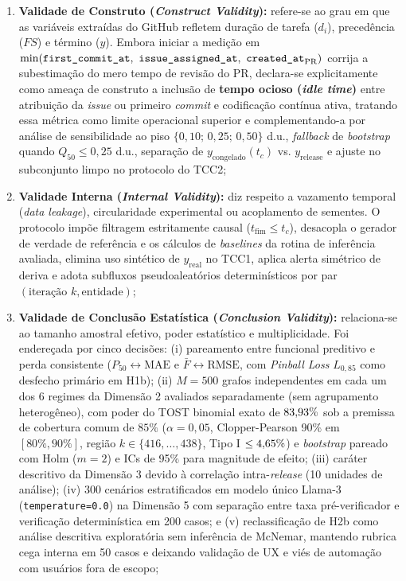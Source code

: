 \documentclass[12pt,openany,oneside,a4paper,english,brazilian,sumario=tradicional]{abntex2}
\begin{document}
\begin{enumerate}
  \item \textbf{Validade de Construto (\textit{Construct Validity}):} refere-se ao grau em que as variáveis extraídas do GitHub refletem duração de tarefa ($d_i$), precedência ($FS$) e término ($y$). Embora iniciar a medição em $\min(\texttt{first\_\allowbreak commit\_\allowbreak at},\allowbreak\ \texttt{issue\_\allowbreak assigned\_\allowbreak at},\allowbreak\ \texttt{created\_\allowbreak at}_{\mathrm{PR}})$ corrija a subestimação do mero tempo de revisão do PR, declara-se explicitamente como ameaça de construto a inclusão de \textbf{tempo ocioso (\textit{idle time})} entre atribuição da \textit{issue} ou primeiro \textit{commit} e codificação contínua ativa, tratando essa métrica como limite operacional superior e complementando-a por análise de sensibilidade ao piso $\{0{,}10;\,0{,}25;\,0{,}50\}$ d.u., \textit{fallback} de \textit{bootstrap} quando $Q_{50} \le 0{,}25$ d.u., separação de $y_{\mathrm{congelado}}(t_c)$ vs. $y_{\mathrm{release}}$ e ajuste no subconjunto limpo no protocolo do TCC2;
  \item \textbf{Validade Interna (\textit{Internal Validity}):} diz respeito a vazamento temporal (\textit{data leakage}), circularidade experimental ou acoplamento de sementes. O protocolo impõe filtragem estritamente causal ($t_{\mathrm{fim}} \le t_c$), desacopla o gerador de verdade de referência e os cálculos de \textit{baselines} da rotina de inferência avaliada, elimina uso sintético de $y_{\mathrm{real}}$ no TCC1, aplica alerta simétrico de deriva e adota subfluxos pseudoaleatórios determinísticos por par $(\text{iteração } k, \text{entidade})$;
  \item \textbf{Validade de Conclusão Estatística (\textit{Conclusion Validity}):} relaciona-se ao tamanho amostral efetivo, poder estatístico e multiplicidade. Foi endereçada por cinco decisões: (i) pareamento entre funcional preditivo e perda consistente \cite{gneiting2011} ($P_{50} \leftrightarrow \mathrm{MAE}$ e $\bar{F} \leftrightarrow \mathrm{RMSE}$, com \textit{Pinball Loss} $L_{0{,}85}$ como desfecho primário em H1b); (ii) $M=500$ grafos independentes em cada um dos 6 regimes da Dimensão 2 avaliados separadamente (sem agrupamento heterogêneo), com poder do TOST binomial exato de $83{,}93{}\%$ sob a premissa de cobertura comum de $85\%$ ($\alpha=0{,}05$, Clopper-Pearson 90\% em $[80\%,90\%]$, região $k \in \{416,\dots,438\}$, Tipo I $\le 4{,}65{}\%$) e \textit{bootstrap} pareado com Holm ($m=2$) e ICs de 95\% para magnitude de efeito; (iii) caráter descritivo da Dimensão 3 devido à correlação intra-\textit{release} (10 unidades de análise); (iv) 300 cenários estratificados em modelo único Llama-3 (\texttt{temperature=0.0}) na Dimensão 5 com separação entre taxa pré-verificador e verificação determinística em 200 casos; e (v) reclassificação de H2b como análise descritiva exploratória sem inferência de McNemar, mantendo rubrica cega interna em 50 casos e deixando validação de UX e viés de automação com usuários fora de escopo;

\end{enumerate}
\end{document}

